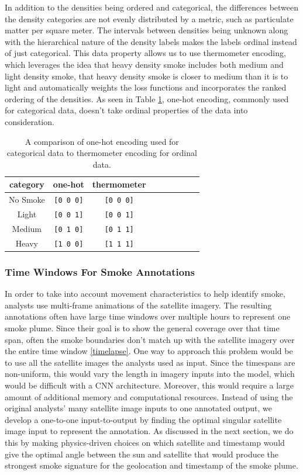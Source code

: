 \documentclass{article}
\begin{document}
In addition to the densities being ordered and categorical, the differences between the density categories are not evenly distributed by a metric, such as particulate matter per square meter. The intervals between densities being unknown along with the hierarchical nature of the density labels makes the labels ordinal instead of just categorical. This data property allows us to use thermometer encoding, which leverages the idea that heavy density smoke includes both medium and light density smoke, that heavy density smoke is closer to medium than it is to light and automatically weights the loss functions and incorporates the ranked ordering of the densities.  As seen in Table \ref{therm}, one-hot encoding, commonly used for categorical data, doesn't take ordinal properties of the data into consideration.  

\begin{table}[h] 
    \caption{A comparison of one-hot encoding used for categorical data to thermometer encoding for ordinal data.}\label{therm}
    \centering
    \begin{tabular}{ccccrrcrc}
        \toprule
        category & one-hot & thermometer \\
        \midrule
        No Smoke & \texttt{[0 0 0]} & \texttt{[0 0 0]} \\
        Light  & \texttt{[0 0 1]} & \texttt{[0 0 1]} \\
        Medium & \texttt{[0 1 0]} & \texttt{[0 1 1]} \\
        Heavy  & \texttt{[1 0 0]} & \texttt{[1 1 1]} \\
        \bottomrule
    \end{tabular}
\end{table}

\subsubsection*{Time Windows For Smoke Annotations}

In order to take into account movement characteristics to help identify smoke, analysts use multi-frame animations of the satellite imagery. The resulting annotations often have large time windows over multiple hours to represent one smoke plume. Since their goal is to show the general coverage over that time span, often the smoke boundaries don't match up with the satellite imagery over the entire time window \ref{timelapse}. One way to approach this problem would be to use all the satellite images the analysts used as input. Since the timespans are non-uniform, this would vary the length in imagery inputs into the model, which would be difficult with a CNN architecture. Moreover, this would require a large amount of additional memory and computational resources. Instead of using the original analysts' many satellite image inputs to one annotated output, we develop a one-to-one input-to-output by finding the optimal singular satellite image input to represent the annotation. As
discussed in the next section, we do this by making physics-driven choices on which satellite and timestamp would give the optimal angle between the sun and satellite that would produce the strongest smoke signature for the geolocation and timestamp of the smoke plume. 
\end{document}
